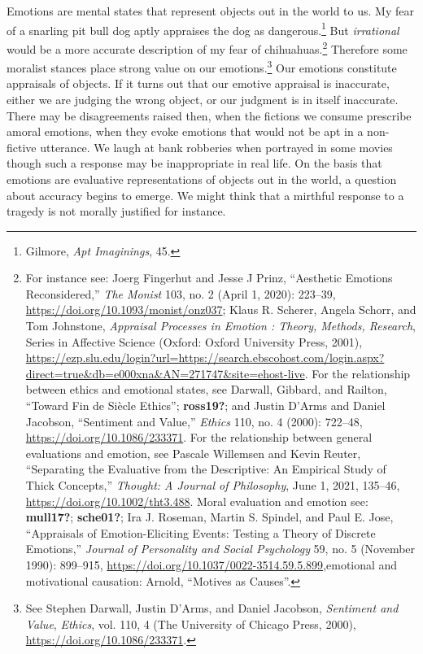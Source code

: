 \documentclass[phdthesis,12pt,final]{wuthesis}
\theoremstyle{definition}
\theoremstyle{definition}
\theoremstyle{definition}
\theoremstyle{definition}
\theoremstyle{remark}
\begin{document}
Emotions are mental states that represent objects out in the world to us. My fear of a snarling pit bull dog aptly appraises the dog as dangerous.\footnote{Gilmore, \emph{Apt {Imaginings}}, 45.} But \emph{irrational} would be a more accurate description of my fear of chihuahuas.\footnote{For instance see: Joerg Fingerhut and Jesse J Prinz, {``Aesthetic Emotions Reconsidered,''} \emph{The Monist} 103, no. 2 (April 1, 2020): 223--39, \url{https://doi.org/10.1093/monist/onz037}; Klaus R. Scherer, Angela Schorr, and Tom Johnstone, \emph{Appraisal {Processes} in {Emotion} : {Theory}, {Methods}, {Research}}, Series in {Affective Science} (Oxford: Oxford University Press, 2001), \url{https://ezp.slu.edu/login?url=https://search.ebscohost.com/login.aspx?direct=true&db=e000xna&AN=271747&site=ehost-live}. For the relationship between ethics and emotional states, see Darwall, Gibbard, and Railton, {``Toward Fin de Siècle Ethics''}; \textbf{ross19?}; and Justin D'Arms and Daniel Jacobson, {``Sentiment and {Value},''} \emph{Ethics} 110, no. 4 (2000): 722--48, \url{https://doi.org/10.1086/233371}. For the relationship between general evaluations and emotion, see Pascale Willemsen and Kevin Reuter, {``Separating the Evaluative from the Descriptive: {An} Empirical Study of Thick Concepts,''} \emph{Thought: A Journal of Philosophy}, June 1, 2021, 135--46, \url{https://doi.org/10.1002/tht3.488}. Moral evaluation and emotion see: \textbf{mull17?}; \textbf{sche01?}; Ira J. Roseman, Martin S. Spindel, and Paul E. Jose, {``Appraisals of Emotion-Eliciting Events: {Testing} a Theory of Discrete Emotions,''} \emph{Journal of Personality and Social Psychology} 59, no. 5 (November 1990): 899--915, \url{https://doi.org/10.1037/0022-3514.59.5.899},emotional and motivational causation: Arnold, {``Motives as Causes''}.} Therefore some moralist stances place strong value on our emotions.\footnote{See Stephen Darwall, Justin D'Arms, and Daniel Jacobson, \emph{Sentiment and {Value}}, \emph{Ethics}, vol. 110, 4 (The University of Chicago Press, 2000), \url{https://doi.org/10.1086/233371}.} Our emotions constitute appraisals of objects. If it turns out that our emotive appraisal is inaccurate, either we are judging the wrong object, or our judgment is in itself inaccurate. There may be disagreements raised then, when the fictions we consume prescribe amoral emotions, when they evoke emotions that would not be apt in a non-fictive utterance. We laugh at bank robberies when portrayed in some movies though such a response may be inappropriate in real life. On the basis that emotions are evaluative representations of objects out in the world, a question about accuracy begins to emerge. We might think that a mirthful response to a tragedy is not morally justified for instance.
\end{document}
